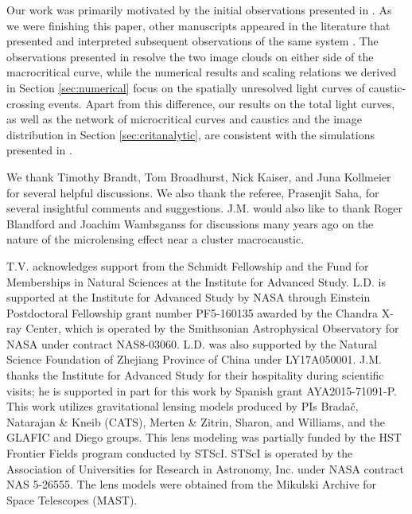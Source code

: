 \documentclass{aastex6}
\begin{document}
Our work was primarily motivated by the initial observations presented in \cite{2016ATel.9097....1K}. As we were finishing this paper, other manuscripts appeared in the literature that presented and interpreted subsequent observations of the same system \citep{2017arXiv170610279K, 2017arXiv170610281D}. The observations presented in \cite{2017arXiv170610279K} resolve the two image clouds on either side of the macrocritical curve, while the numerical results and scaling relations we derived in Section \ref{sec:numerical} focus on the spatially unresolved light curves of caustic-crossing events. Apart from this difference, our results on the total light curves, as well as the network of microcritical curves and caustics and the image distribution in Section \ref{sec:critanalytic}, are consistent with the simulations presented in \cite{2017arXiv170610281D}.

\acknowledgments

 We thank Timothy Brandt, Tom Broadhurst, Nick Kaiser, and Juna
Kollmeier for several helpful discussions. We also thank the referee, Prasenjit Saha, for several insightful comments and suggestions. J.M. would also like to thank Roger
Blandford and Joachim Wambsganss for discussions many years ago on the
nature of the microlensing effect near a cluster macrocaustic.

T.V. acknowledges support from the Schmidt Fellowship and the Fund for Memberships in Natural Sciences at the Institute for Advanced Study. L.D. is supported at the Institute for Advanced Study by NASA through Einstein Postdoctoral Fellowship grant number PF5-160135 awarded by the Chandra X-ray Center, which is operated by the Smithsonian Astrophysical Observatory for NASA under contract NAS8-03060. L.D. was also supported by the Natural Science Foundation of Zhejiang Province of China under LY17A050001. 
J.M. thanks the Institute for Advanced Study for their hospitality during
scientific visits; he is supported in part for this work by Spanish grant
AYA2015-71091-P.
This work utilizes gravitational lensing models produced by PIs Brada\v{c}, Natarajan \& Kneib (CATS), Merten \& Zitrin, Sharon, and Williams, and the GLAFIC and Diego groups. This lens modeling was partially funded by the HST Frontier Fields program conducted by STScI. STScI is operated by the Association of Universities for Research in Astronomy, Inc. under NASA contract NAS 5-26555. The lens models were obtained from the Mikulski Archive for Space Telescopes (MAST).
\end{document}
